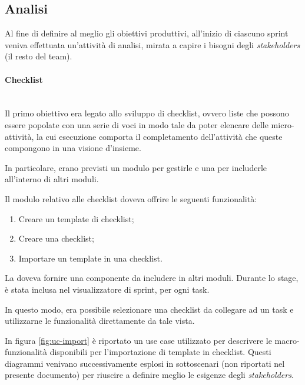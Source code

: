 \subsection{Analisi}

Al fine di definire al meglio gli obiettivi produttivi, all'inizio di ciascuno
sprint veniva effettuata un'attività di analisi, mirata a capire i bisogni
degli \emph{stakeholders} (il resto del team).

\paragraph{Checklist} \mbox{} \\

Il primo obiettivo era legato allo sviluppo di checklist, ovvero liste che
possono essere popolate con una serie di voci in modo tale da poter elencare
delle micro-attività, la cui esecuzione comporta il completamento
dell'attività che queste compongono in una visione d'insieme.

In particolare, erano previsti un modulo per gestirle e una 
per includerle all'interno di altri moduli.

Il modulo relativo alle checklist doveva offrire le seguenti funzionalità:

\begin{enumerate}
\item Creare un template di checklist;
\item Creare una checklist;
\item Importare un template in una checklist.
\end{enumerate}

La  doveva fornire una componente da includere in altri
moduli. Durante lo stage, è stata inclusa nel visualizzatore di sprint, per
ogni task.

In questo modo, era possibile selezionare una checklist da collegare ad un
task e utilizzarne le funzionalità direttamente da tale vista.

In figura \ref{fig:uc-import} è riportato un use case utilizzato per
descrivere le macro-funzionalità disponibili per l'importazione di template in
checklist. Questi diagrammi venivano successivamente esplosi in sottoscenari
(non riportati nel presente documento) per riuscire a definire meglio le
esigenze degli \emph{stakeholders}. \\

